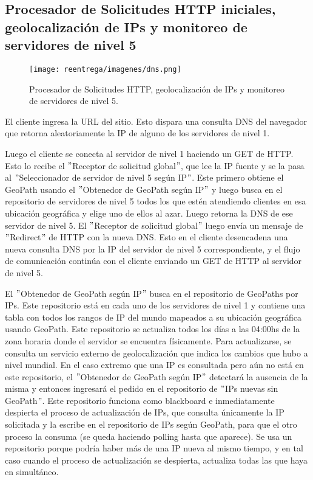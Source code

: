 \subsection{Procesador de Solicitudes HTTP iniciales, geolocalización de IPs y monitoreo de servidores de nivel 5} \label{seccionDNS}

\begin{figure}[H]
   \centering
   \texttt{[image: reentrega/imagenes/dns.png]}
   \caption{Procesador de Solicitudes HTTP, geolocalización de IPs y monitoreo de servidores de nivel 5.}
\end{figure}

El cliente ingresa la URL del sitio. Esto dispara una consulta DNS del navegador
que retorna aleatoriamente la IP de alguno de los servidores de nivel 1.

Luego el cliente se conecta al servidor de nivel 1 haciendo un GET de HTTP. Esto
lo recibe el $"$Receptor de solicitud global$"$, que lee la IP fuente y se la pasa al
$"$Seleccionador de servidor de nivel 5 según IP$"$. Este primero obtiene el GeoPath
usando el $"$Obtenedor de GeoPath según IP$"$ y luego busca en el repositorio de servidores
de nivel 5 todos los que estén atendiendo clientes en esa ubicación geográfica y elige uno
de ellos al azar. Luego retorna la DNS de ese servidor de nivel 5. El $"$Receptor de solicitud
global$"$ luego envía un mensaje de $"$Redirect$"$ de HTTP con la nueva DNS. Esto en el cliente
desencadena una nueva consulta DNS por la IP del servidor de nivel 5 correspondiente, y el
flujo de comunicación continúa con el cliente enviando un GET de HTTP al servidor de nivel 5.

El $"$Obtenedor de GeoPath según IP$"$ busca en el repositorio de GeoPaths por IPs. Este
repositorio está en cada uno de los servidores de nivel 1 y contiene una tabla con todos los
rangos de IP del mundo mapeados a su ubicación geográfica usando GeoPath. Este repositorio
se actualiza todos los días a las 04:00hs de la zona horaria donde el servidor se encuentra
físicamente. Para actualizarse, se consulta un servicio externo de geolocalización que indica los
cambios que hubo a nivel mundial. En el caso extremo que una IP es consultada pero aún no
está en este repositorio, el $"$Obtenedor de GeoPath según IP$"$ detectará la ausencia de la misma
y entonces ingresará el pedido en el repositorio de $"$IPs nuevas sin GeoPath$"$. Este repositorio
funciona como blackboard e inmediatamente despierta el proceso de actualización de IPs,
que consulta únicamente la IP solicitada y la escribe en el repositorio de IPs según GeoPath, para
que el otro proceso la consuma (se queda haciendo polling hasta que aparece). Se usa un
repositorio porque podría haber más de una IP nueva al mismo tiempo, y en tal caso cuando el proceso
de actualización se despierta, actualiza todas las que haya en simultáneo.

